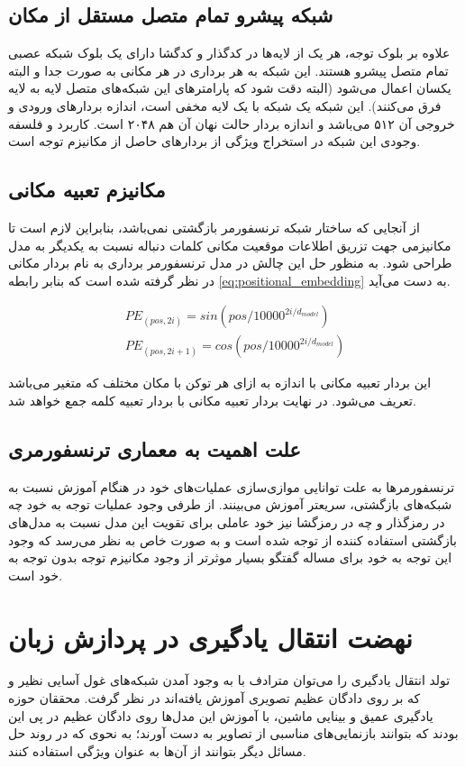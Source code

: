 \subsection{شبکه پیشرو تمام متصل مستقل از مکان}
علاوه بر بلوک توجه، هر یک از لایه‌ها در کدگذار و کدگشا دارای یک بلوک شبکه عصبی تمام متصل پیشرو هستند. این شبکه به هر برداری در هر مکانی به صورت جدا و البته یکسان اعمال می‌شود (البته دقت شود که پارامتر‌های این شبکه‌های متصل لایه به لایه فرق می‌کنند). این شبکه یک شبکه با یک لایه مخفی است، اندازه بردارهای ورودی و خروجی آن ۵۱۲ می‌باشد و اندازه بردار حالت نهان آن هم ۲۰۴۸ است. کاربرد و فلسفه وجودی این شبکه در استخراج ویژگی از بردارهای حاصل از مکانیزم توجه است.


\subsection{
مکانیزم تعبیه
مکانی
}

از آنجایی که ساختار شبکه ترنسفورمر بازگشتی نمی‌باشد، بنابراین لازم است تا مکانیزمی جهت تزریق اطلاعات موقعیت مکانی کلمات دنباله نسبت به یکدیگر به مدل طراحی شود. به منظور حل این چالش در مدل ترنسفورمر برداری به نام بردار 
 مکانی در نظر گرفته شده است که بنابر رابطه
\ref{eq:positional_embedding}
به دست می‌آید.

\begin{align} \label{eq:positional_embedding}
PE_{(pos, 2i)} = sin(pos/10000^{2i/d_{model}}) \\  \nonumber
PE_{(pos, 2i+1)} = cos(pos/10000^{2i/d_{model}}) 
\end{align}

این بردار تعبیه مکانی با اندازه 
 به ازای هر توکن با مکان مختلف که متغیر
می‌باشد تعریف می‌شود. در نهایت بردار تعبیه مکانی با بردار تعبیه کلمه جمع خواهد شد.

\subsection{علت اهمیت به معماری ترنسفورمری}
ترنسفورمر‌ها به علت توانایی موازی‌سازی عملیات‌های خود در هنگام آموزش نسبت به شبکه‌های بازگشتی، سریعتر آموزش می‌بینند. از طرفی وجود عملیات توجه به خود چه در رمزگذار و چه در رمزگشا نیز خود عاملی برای تقویت این مدل نسبت به مدل‌های بازگشتی استفاده کننده از توجه شده است و به صورت خاص به نظر می‌رسد که وجود این توجه به خود برای مساله گفتگو بسیار موثرتر از وجود مکانیزم توجه بدون توجه به خود است.

\section{نهضت انتقال یادگیری در پردازش زبان}
تولد 
 انتقال یادگیری را می‌توان مترادف با به وجود آمدن شبکه‌های غول آسایی نظیر
و
که بر روی دادگان عظیم تصویری آموزش یافته‌اند در نظر گرفت. محققان حوزه یادگیری عمیق و بینایی ماشین، با آموزش این مدل‌ها روی دادگان عظیم در پی این بودند که بتوانند بازنمایی‌های مناسبی از تصاویر به دست آورند؛ به نحوی که در روند حل مسائل دیگر بتوانند از آن‌ها به عنوان ویژگی‌ استفاده کنند. 

